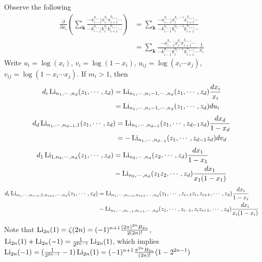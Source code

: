 \documentclass[main]{subfiles}
\begin{document}
\begin{exercise}
Observe the following
\begin{align*}
\frac{\partial}{\partial x_i}\left(\sum_{\mathbf k}\frac{\cdots x_{i-1}^{k_{i-1}}x_i^{k_i}x_{i+1}^{k_{i+1}}\cdots}{\cdots k_{i-1}^{n_{i-1}}k_i^{n_i}k_{i+1}^{n_{i+1}}\cdots}\right)&=\sum_{\mathbf k}\frac{\cdots x_{i-1}^{k_{i-1}}x_i^{k_i-1}x_{i+1}^{k_{i+1}}\cdots}{\cdots k_{i-1}^{n_{i-1}}k_i^{n_i-1}k_{i+1}^{n_{i+1}}\cdots} \\
&=\sum_{\mathbf k}\frac{\cdots x_{i-1}^{k_{i-1}}x_i^{k_i}x_{i+1}^{k_{i+1}}\cdots}{\cdots k_{i-1}^{n_{i-1}}k_i^{n_i-1}k_{i+1}^{n_{i+1}}\cdots}\frac{1}{x_i}
\end{align*}
Write $u_i=\log(x_i)$, $v_i=\log(1-x_i)$, $u_{ij}=\log(x_i\cdots x_j)$, $v_{ij}=\log(1-x_i\cdots x_j)$. If $m_i>1$, then
\begin{align*}
d_i\operatorname{Li}_{n_1,\cdots,n_d}(z_1,\cdots,z_d)&=\operatorname{Li}_{n_1,\cdots,n_i-1,\cdots,n_d}(z_1,\cdots,z_d)\frac{d x_i}{x_i} \\
&=\operatorname{Li}_{n_1,\cdots,n_i-1,\cdots,n_d}(z_1,\cdots,z_d)du_i
\end{align*}
\begin{align*}
d_d\operatorname{Li}_{n_1,\cdots,n_{d-1},1}(z_1,\cdots,z_d)&=\operatorname{Li}_{n_1,\cdots,n_{d-1}}(z_1,\cdots,z_{d-1}z_d)\frac{d x_d}{1-x_d} \\
&=-\operatorname{Li}_{n_1,\cdots,n_{d-1}}(z_1,\cdots,z_{d-1}z_d)dv_d
\end{align*}
\begin{align*}
d_1\operatorname{Li}_{1,n_2,\cdots,n_d}(z_1,\cdots,z_d)&=\operatorname{Li}_{n_2,\cdots,n_d}(z_2,\cdots,z_d)\frac{d x_1}{1-x_1} \\
&-\operatorname{Li}_{n_2,\cdots,n_d}(z_1z_2,\cdots,z_d)\frac{dx_1}{x_1(1-x_1)}
\end{align*}
\begin{align*}
d_i\operatorname{Li}_{n_1,\cdots,n_{i-1},1,n_{i+1},\cdots,n_d}(z_1,\cdots,z_d)&=\operatorname{Li}_{n_1,\cdots,n_{i-1},n_{i+1},\cdots,n_d}(z_1,\cdots,z_{i-1}z_i,z_{i+1},\cdots,z_d)\frac{d x_i}{1-x_i} \\
&-\operatorname{Li}_{n_1,\cdots,n_{i-1},n_{i+1},\cdots,n_d}(z_1,\cdots,z_{i-1},z_iz_{i+1},\cdots,z_d)\frac{dx_i}{x_i(1-x_i)}
\end{align*}
\end{exercise}

\begin{remark}

\end{remark}

Note that $\operatorname{Li}_{2n}(1)=\zeta(2n)=(-1)^{n+1}\frac{(2\pi)^{2n}B_{2n}}{2(2n)!}$, $\operatorname{Li}_{2n}(1)+\operatorname{Li}_{2n}(-1)=\frac{1}{2^{2n-1}}\operatorname{Li}_{2n}(1)$, which implies $\operatorname{Li}_{2n}(-1)=(\frac{1}{2^{2n-1}}-1)\operatorname{Li}_{2n}(1)=(-1)^{n+1}\frac{\pi^{2n}B_{2n}}{(2n)!}(1-2^{2n-1})$
\end{document}
